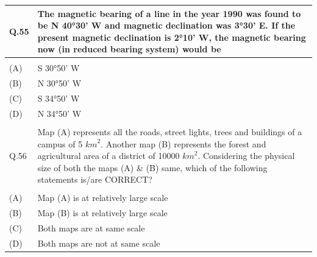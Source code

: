 \documentclass[12pt]{article}
\begin{document}
\begin{table}[H]
\renewcommand{\arraystretch}{3}
\setlength{\tabcolsep}{8pt}
\begin{tabular}{|l|p{15cm}|}
\hline
 
Q.55& The magnetic bearing of a line in the year 1990 was found to be N 40°30' W and
magnetic declination was 3°30' E. If the present magnetic declination is 2°10' W,
the magnetic bearing now (in reduced bearing system) would be\\ \hline 
 & \\ \hline
(A)&S 30°50' W\\ \hline
(B)&N 30°50' W\\ \hline
(C)&S 34°50' W\\ \hline
(D)&N 34°50' W\\ \hline
 & \\ \hline

Q.56 &Map (A) represents all the roads, street lights, trees and buildings of a campus of
5 ${km}^2$. Another map (B) represents the forest and agricultural area of a district of
10000 ${km}^2$. Considering the physical size of both the maps (A) \& (B) same, which
of the following statements is/are CORRECT?\\ \hline
 & \\ \hline
(A)&Map (A) is at relatively large scale\\ \hline
(B)&Map (B) is at relatively large scale\\ \hline
(C)&Both maps are at same scale\\ \hline
(D)&Both maps are not at same scale\\ \hline


\end{tabular}
\end{table}
\end{document}
